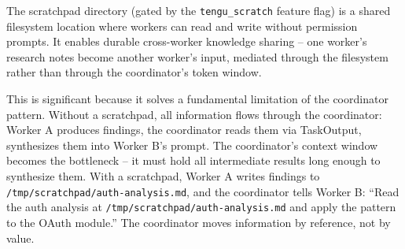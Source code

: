 \documentclass[
  english,
  11pt,
  letterpaper,
]{book}
\newenvironment{Shaded}{\begin{snugshade}}{\end{snugshade}}
\newcommand{\AttributeTok}[1]{\textcolor[rgb]{0.40,0.45,0.13}{#1}}
\newcommand{\ControlFlowTok}[1]{\textcolor[rgb]{0.00,0.23,0.31}{\textbf{#1}}}
\newcommand{\DecValTok}[1]{\textcolor[rgb]{0.68,0.00,0.00}{#1}}
\newcommand{\FunctionTok}[1]{\textcolor[rgb]{0.28,0.35,0.67}{#1}}
\newcommand{\ImportTok}[1]{\textcolor[rgb]{0.00,0.46,0.62}{#1}}
\newcommand{\KeywordTok}[1]{\textcolor[rgb]{0.00,0.23,0.31}{\textbf{#1}}}
\newcommand{\NormalTok}[1]{\textcolor[rgb]{0.00,0.23,0.31}{#1}}
\newcommand{\OperatorTok}[1]{\textcolor[rgb]{0.37,0.37,0.37}{#1}}
\newcommand{\SpecialCharTok}[1]{\textcolor[rgb]{0.37,0.37,0.37}{#1}}
\newcommand{\StringTok}[1]{\textcolor[rgb]{0.13,0.47,0.30}{#1}}
\newcommand{\VerbatimStringTok}[1]{\textcolor[rgb]{0.13,0.47,0.30}{#1}}
\begin{document}
\begin{Shaded}
\end{Shaded}

The scratchpad directory (gated by the \texttt{tengu\_scratch} feature
flag) is a shared filesystem location where workers can read and write
without permission prompts. It enables durable cross-worker knowledge
sharing -- one worker's research notes become another worker's input,
mediated through the filesystem rather than through the coordinator's
token window.

This is significant because it solves a fundamental limitation of the
coordinator pattern. Without a scratchpad, all information flows through
the coordinator: Worker A produces findings, the coordinator reads them
via TaskOutput, synthesizes them into Worker B's prompt. The
coordinator's context window becomes the bottleneck -- it must hold all
intermediate results long enough to synthesize them. With a scratchpad,
Worker A writes findings to \texttt{/tmp/scratchpad/auth-analysis.md},
and the coordinator tells Worker B: ``Read the auth analysis at
\texttt{/tmp/scratchpad/auth-analysis.md} and apply the pattern to the
OAuth module.'' The coordinator moves information by reference, not by
value.
\end{document}
